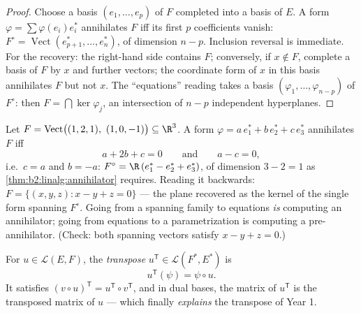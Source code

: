 \begin{proof}
Choose a basis $(e_1, \dots, e_p)$ of $F$ completed into a basis of
$E$. A form $\varphi = \sum \varphi(e_i) e_i^*$ annihilates $F$ iff
its first $p$ coefficients vanish: $F^\circ =
\operatorname{Vect}(e_{p+1}^*, \dots, e_n^*)$, of dimension $n - p$.
Inclusion reversal is immediate. For the recovery: the right-hand
side contains $F$; conversely, if $x \notin F$, complete a basis of
$F$ by $x$ and further vectors; the coordinate form of $x$ in this
basis annihilates $F$ but not $x$. The ``equations'' reading takes a
basis $(\varphi_1, \dots, \varphi_{n-p})$ of $F^\circ$: then $F =
\bigcap \ker\varphi_j$, an intersection of $n - p$ independent
hyperplanes.
\end{proof}

\begin{example}\label{ex:b2:linalg:annihilatorwork}
Let $F = \operatorname{Vect}\bigl((1, 2, 1),\ (1, 0, -1)\bigr)
\subseteq \R^3$. A form $\varphi = a\,e_1^* + b\,e_2^* + c\,e_3^*$
annihilates $F$ iff
\[
a + 2b + c = 0
\qquad\text{and}\qquad
a - c = 0 ,
\]
i.e.\ $c = a$ and $b = -a$: $F^\circ = \R\,(e_1^* - e_2^* +
e_3^*)$, of dimension $3 - 2 = 1$ as
\cref{thm:b2:linalg:annihilator} requires. Reading it backwards:
$F = \{(x, y, z) : x - y + z = 0\}$ --- the plane recovered as
the kernel of the single form spanning $F^\circ$. Going from a
spanning family to equations \emph{is} computing an annihilator;
going from equations to a parametrization is computing a
pre-annihilator. (Check: both spanning vectors satisfy $x - y +
z = 0$.)
\end{example}

\begin{definition}\label{def:b2:linalg:transpose}
For $u \in \mathcal{L}(E, F)$, the \emph{transpose} $u^{\mathsf T} \in \mathcal{L}(F^*, E^*)$ is
\[
u^{\mathsf T}(\psi) = \psi \circ u .
\]
It satisfies $(v \circ u)^{\mathsf T} = u^{\mathsf T} \circ v^{\mathsf
T}$, and in dual bases, the matrix of $u^{\mathsf T}$ is the
transposed matrix of $u$ --- which finally \emph{explains} the
transpose of Year 1.
\end{definition}

